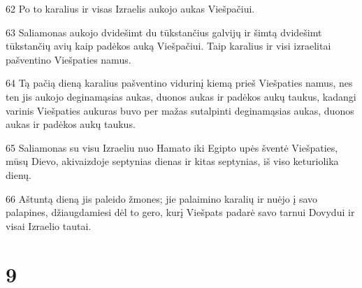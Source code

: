 \par 62 Po to karalius ir visas Izraelis aukojo aukas Viešpačiui. 
\par 63 Saliamonas aukojo dvidešimt du tūkstančius galvijų ir šimtą dvidešimt tūkstančių avių kaip padėkos auką Viešpačiui. Taip karalius ir visi izraelitai pašventino Viešpaties namus. 
\par 64 Tą pačią dieną karalius pašventino vidurinį kiemą prieš Viešpaties namus, nes ten jis aukojo deginamąsias aukas, duonos aukas ir padėkos aukų taukus, kadangi varinis Viešpaties aukuras buvo per mažas sutalpinti deginamąsias aukas, duonos aukas ir padėkos aukų taukus. 
\par 65 Saliamonas su visu Izraeliu nuo Hamato iki Egipto upės šventė Viešpaties, mūsų Dievo, akivaizdoje septynias dienas ir kitas septynias, iš viso keturiolika dienų. 
\par 66 Aštuntą dieną jis paleido žmones; jie palaimino karalių ir nuėjo į savo palapines, džiaugdamiesi dėl to gero, kurį Viešpats padarė savo tarnui Dovydui ir visai Izraelio tautai.



\chapter{9}


